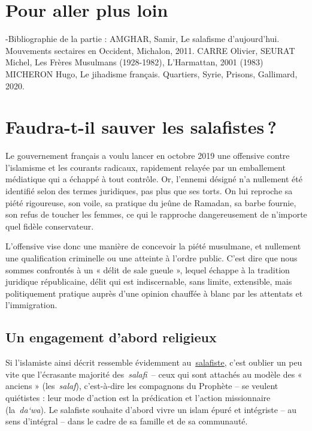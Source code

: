 \section{Pour aller plus loin}
-Bibliographie de la partie :
AMGHAR, Samir, Le salafisme d’aujourd’hui. Mouvements sectaires en Occident,
Michalon, 2011.
CARRE Olivier, SEURAT Michel, Les Frères Musulmans (1928-1982), L'Harmattan,
2001 (1983)
MICHERON Hugo, Le jihadisme français. Quartiers, Syrie, Prisons, Gallimard, 2020.





\section{Faudra-t-il sauver les salafistes ?}

Le gouvernement français a voulu lancer en octobre 2019 une offensive
contre l'islamisme et les courants radicaux, rapidement relayée par un
emballement médiatique qui a échappé à tout contrôle. Or, l'ennemi
désigné n'a nullement été identifié selon des termes juridiques, pas
plus que ses torts. On lui reproche sa piété rigoureuse, son voile, sa
pratique du jeûne de Ramadan, sa barbe fournie, son refus de toucher les
femmes, ce qui le rapproche dangereusement de n'importe quel fidèle
conservateur.

L'offensive vise donc une manière de concevoir la piété musulmane, et
nullement une qualification criminelle ou une atteinte à l'ordre public.
C'est dire que nous sommes confrontés à un « délit de sale gueule »,
lequel échappe à la tradition juridique républicaine, délit qui est
indiscernable, sans limite, extensible, mais politiquement pratique
auprès d'une opinion chauffée à blanc par les attentats et
l'immigration.

\subsection{Un engagement d'abord religieux}

Si l'islamiste ainsi décrit ressemble évidemment
au~\href{https://www.la-croix.com/Religion/Islam/Quest-salafisme-2018-10-14-1200975866}{\underline{salafiste}},
c'est oublier un peu vite que l'écrasante majorité des~\emph{salafi~}--
ceux qui sont attachés au modèle des « anciens » (les~\emph{salaf}),
c'est-à-dire les compagnons du Prophète -- se veulent quiétistes : leur
mode d'action est la prédication et l'action missionnaire
(la~\emph{da`wa}). Le salafiste souhaite d'abord vivre un islam épuré et
intégriste -- au sens d'intégral -- dans le cadre de sa famille et de sa
communauté.

